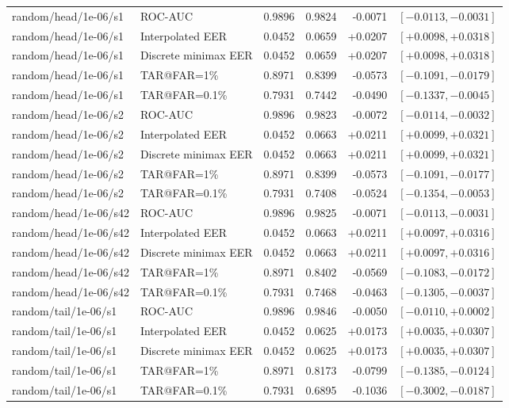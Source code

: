 \begin{table}[!t]
\begin{tabular}{@{}llrrrr@{}}
random/head/1e-06/s1 & ROC-AUC & 0.9896 & 0.9824 & -0.0071 & $[-0.0113,-0.0031]$ \\
random/head/1e-06/s1 & Interpolated EER & 0.0452 & 0.0659 & +0.0207 & $[+0.0098,+0.0318]$ \\
random/head/1e-06/s1 & Discrete minimax EER & 0.0452 & 0.0659 & +0.0207 & $[+0.0098,+0.0318]$ \\
random/head/1e-06/s1 & TAR@FAR=1\% & 0.8971 & 0.8399 & -0.0573 & $[-0.1091,-0.0179]$ \\
random/head/1e-06/s1 & TAR@FAR=0.1\% & 0.7931 & 0.7442 & -0.0490 & $[-0.1337,-0.0045]$ \\
random/head/1e-06/s2 & ROC-AUC & 0.9896 & 0.9823 & -0.0072 & $[-0.0114,-0.0032]$ \\
random/head/1e-06/s2 & Interpolated EER & 0.0452 & 0.0663 & +0.0211 & $[+0.0099,+0.0321]$ \\
random/head/1e-06/s2 & Discrete minimax EER & 0.0452 & 0.0663 & +0.0211 & $[+0.0099,+0.0321]$ \\
random/head/1e-06/s2 & TAR@FAR=1\% & 0.8971 & 0.8399 & -0.0573 & $[-0.1091,-0.0177]$ \\
random/head/1e-06/s2 & TAR@FAR=0.1\% & 0.7931 & 0.7408 & -0.0524 & $[-0.1354,-0.0053]$ \\
random/head/1e-06/s42 & ROC-AUC & 0.9896 & 0.9825 & -0.0071 & $[-0.0113,-0.0031]$ \\
random/head/1e-06/s42 & Interpolated EER & 0.0452 & 0.0663 & +0.0211 & $[+0.0097,+0.0316]$ \\
random/head/1e-06/s42 & Discrete minimax EER & 0.0452 & 0.0663 & +0.0211 & $[+0.0097,+0.0316]$ \\
random/head/1e-06/s42 & TAR@FAR=1\% & 0.8971 & 0.8402 & -0.0569 & $[-0.1083,-0.0172]$ \\
random/head/1e-06/s42 & TAR@FAR=0.1\% & 0.7931 & 0.7468 & -0.0463 & $[-0.1305,-0.0037]$ \\
random/tail/1e-06/s1 & ROC-AUC & 0.9896 & 0.9846 & -0.0050 & $[-0.0110,+0.0002]$ \\
random/tail/1e-06/s1 & Interpolated EER & 0.0452 & 0.0625 & +0.0173 & $[+0.0035,+0.0307]$ \\
random/tail/1e-06/s1 & Discrete minimax EER & 0.0452 & 0.0625 & +0.0173 & $[+0.0035,+0.0307]$ \\
random/tail/1e-06/s1 & TAR@FAR=1\% & 0.8971 & 0.8173 & -0.0799 & $[-0.1385,-0.0124]$ \\
random/tail/1e-06/s1 & TAR@FAR=0.1\% & 0.7931 & 0.6895 & -0.1036 & $[-0.3002,-0.0187]$ \\

\end{tabular}
\end{table}

